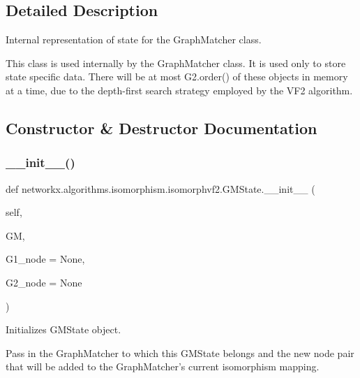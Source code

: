 \subsection{Detailed Description}
\begin{DoxyVerb}Internal representation of state for the GraphMatcher class.

This class is used internally by the GraphMatcher class.  It is used
only to store state specific data. There will be at most G2.order() of
these objects in memory at a time, due to the depth-first search
strategy employed by the VF2 algorithm.
\end{DoxyVerb}
 

\subsection{Constructor \& Destructor Documentation}
\mbox{\label{classnetworkx_1_1algorithms_1_1isomorphism_1_1isomorphvf2_1_1GMState_ac017518ec50f589c26e6937958702e3b}} 
\subsubsection{\texorpdfstring{\+\_\+\+\_\+init\+\_\+\+\_\+()}{\_\_init\_\_()}}
{\footnotesize\ttfamily def networkx.\+algorithms.\+isomorphism.\+isomorphvf2.\+G\+M\+State.\+\_\+\+\_\+init\+\_\+\+\_\+ (\begin{DoxyParamCaption}\item[{}]{self,  }\item[{}]{GM,  }\item[{}]{G1\+\_\+node = {\ttfamily None},  }\item[{}]{G2\+\_\+node = {\ttfamily None} }\end{DoxyParamCaption})}

\begin{DoxyVerb}Initializes GMState object.

Pass in the GraphMatcher to which this GMState belongs and the
new node pair that will be added to the GraphMatcher's current
isomorphism mapping.
\end{DoxyVerb}
 


